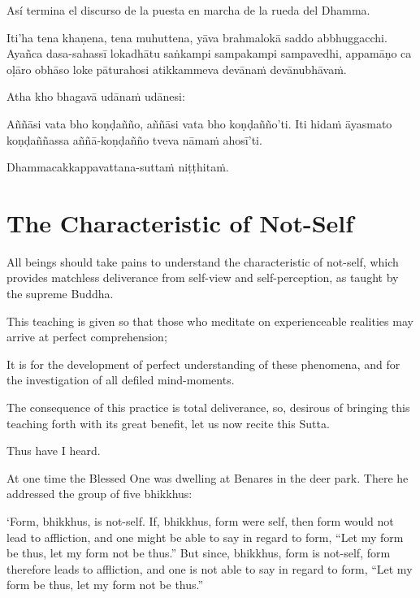 Así termina el discurso de la puesta en marcha de la rueda del Dhamma.

\clearpage

\paliText
\markboth{\paliTitle}{\rightmark}

Iti'ha tena khaṇena, tena muhuttena, yāva brahmalokā saddo abbhuggacchi.
Ayañca dasa-sahassī lokadhātu saṅkampi sampakampi sampavedhi, appamāṇo ca
oḷāro obhāso loke pāturahosi atikkammeva devānaṁ devānubhāvaṁ.

Atha kho bhagavā udānaṁ udānesi:

Aññāsi vata bho koṇḍañño, aññāsi vata bho koṇḍañño'ti. Iti hidaṁ āyasmato
koṇḍaññassa aññā-koṇḍañño tveva nāmaṁ ahosī'ti.

Dhammacakkappavattana-suttaṁ niṭṭhitaṁ.

\chapterTocDelegatePageNumber
\chapter{The Characteristic of Not-Self}

\setTocDelegatedPageNumber
\englishText
\renewcommand{\englishTitle}{The Characteristic of Not-Self}

\begin{leader}

All beings should take pains to understand the characteristic of
not-self, which provides matchless deliverance from self-view and
self-perception, as taught by the supreme Buddha.

This teaching is given so that those who meditate on experienceable
realities may arrive at perfect comprehension;

It is for the development of perfect understanding of these phenomena,
and for the investigation of all defiled mind-moments.

The consequence of this practice is total deliverance, so, desirous of
bringing this teaching forth with its great benefit, let us now recite
this Sutta.

\end{leader}

Thus have I heard.

At one time the Blessed One was dwelling at Benares in the deer park.
There he addressed the group of five bhikkhus:

‘Form, bhikkhus, is not-self. If, bhikkhus, form were self, then form
would not lead to affliction, and one might be able to say in regard to
form, “Let my form be thus, let my form not be thus.” But since,
bhikkhus, form is not-self, form therefore leads to affliction, and one
is not able to say in regard to form, “Let my form be thus, let my form
not be thus.”

